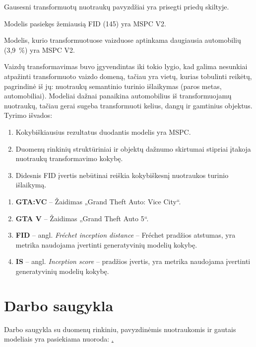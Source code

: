 \documentclass{VUMIFPSbakalaurinis}
\begin{document}
    
Gausesni transformuotų nuotraukų pavyzdžiai yra prisegti priedų skiltyje.

Modelis pasiekęs žemiausią FID (145) yra MSPC V2. 

Modelis, kurio transformuotuose vaizduose aptinkama daugiausia automobilių (3,9~\%) yra MSPC V2.

Vaizdų transformavimas buvo įgyvendintas iki tokio lygio, kad galima nesunkiai atpažinti transformuoto vaizdo domeną, tačiau yra vietų, kurias tobulinti reikėtų, pagrindinė iš jų: nuotraukų semantinio turinio išlaikymas (paros metas, automobiliai). Modeliai dažnai panaikina automobilius iš transformuojamų nuotraukų, tačiau gerai sugeba transformuoti kelius, dangų ir gamtinius objektus.
Tyrimo išvados:
\begin{enumerate}
    \item Kokybiškiausius rezultatus duodantis modelis yra MSPC.
    \item Duomenų rinkinių struktūriniai ir objektų dažnumo skirtumai stipriai įtakoja nuotraukų transformavimo kokybę.
    \item Didesnis FID įvertis nebūtinai reiškia kokybiškesnį nuotraukos turinio išlaikymą.
\end{enumerate}

\begin{enumerate}
    \item \textbf{GTA:VC} – Žaidimas „Grand Theft Auto: Vice City“.
    \item \textbf{GTA V} – Žaidimas „Grand Theft Auto 5“.
    \item \textbf{FID} – angl. \emph{Fréchet inception distance} – Fréchet pradžios atstumas, yra metrika naudojama įvertinti generatyvinių modelių kokybę.
    \item \textbf{IS} – angl. \emph{Inception score} – pradžios įvertis, yra metrika naudojama įvertinti generatyvinių modelių kokybę.
\end{enumerate}

    

\printbibliography[heading=bibintoc]

\appendix

\section{Darbo saugykla}
    Darbo saugykla su duomenų rinkiniu, pavyzdinėmis nuotraukomis ir gautais modeliais yra pasiekiama nuoroda: \href{https://github.com/0ksas/bachelors}.
\end{document}
